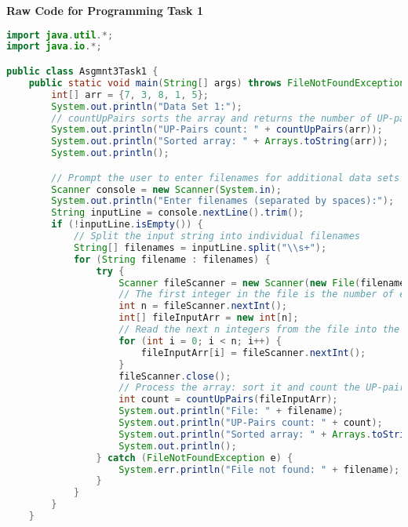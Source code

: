 \documentclass[11pt]{article}
\begin{document}
\pagebreak
\textbf{Raw Code for Programming Task 1}

\lstset{
    basicstyle=\ttfamily\footnotesize,
    breaklines=true,  %
    frame=single,     %
    tabsize=4,        %
    showstringspaces=false %
}

\begin{lstlisting}[language=Java]
import java.util.*;
import java.io.*;

public class Asgmnt3Task1 {
    public static void main(String[] args) throws FileNotFoundException  {
        int[] arr = {7, 3, 8, 1, 5};
        System.out.println("Data Set 1:");
        // countUpPairs sorts the array and returns the number of UP-pairs.
        System.out.println("UP-Pairs count: " + countUpPairs(arr));
        System.out.println("Sorted array: " + Arrays.toString(arr));
        System.out.println();

        // Prompt the user to enter filenames for additional data sets
        Scanner console = new Scanner(System.in);
        System.out.println("Enter filenames (separated by spaces):");
        String inputLine = console.nextLine().trim();
        if (!inputLine.isEmpty()) {
            // Split the input string into individual filenames
            String[] filenames = inputLine.split("\\s+");
            for (String filename : filenames) {
                try {
                    Scanner fileScanner = new Scanner(new File(filename));
                    // The first integer in the file is the number of elements
                    int n = fileScanner.nextInt();
                    int[] fileInputArr = new int[n];
                    // Read the next n integers from the file into the array
                    for (int i = 0; i < n; i++) {
                        fileInputArr[i] = fileScanner.nextInt();
                    }
                    fileScanner.close();
                    // Process the array: sort it and count the UP-pairs using the modified merge sort
                    int count = countUpPairs(fileInputArr);
                    System.out.println("File: " + filename);
                    System.out.println("UP-Pairs count: " + count);
                    System.out.println("Sorted array: " + Arrays.toString(fileInputArr));
                    System.out.println();
                } catch (FileNotFoundException e) {
                    System.err.println("File not found: " + filename);
                }
            }
        }
    }


\end{lstlisting}
\end{document}
